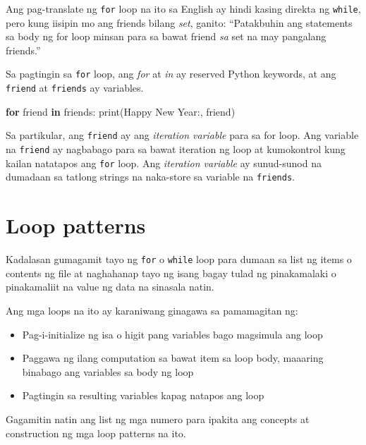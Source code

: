 \documentclass[10pt,]{book}
\newenvironment{Shaded}{}{}
\newcommand{\BuiltInTok}[1]{\textcolor[rgb]{0.00,0.50,0.00}{#1}}
\newcommand{\ControlFlowTok}[1]{\textcolor[rgb]{0.00,0.44,0.13}{\textbf{#1}}}
\newcommand{\KeywordTok}[1]{\textcolor[rgb]{0.00,0.44,0.13}{\textbf{#1}}}
\newcommand{\NormalTok}[1]{#1}
\newcommand{\StringTok}[1]{\textcolor[rgb]{0.25,0.44,0.63}{#1}}
\begin{document}
Ang pag-translate ng \texttt{for} loop na ito sa English ay hindi kasing
direkta ng \texttt{while}, pero kung iisipin mo ang friends bilang
\emph{set}, ganito: ``Patakbuhin ang statements sa body ng for loop
minsan para sa bawat friend \emph{sa} set na may pangalang friends.''

Sa pagtingin sa \texttt{for} loop, ang \emph{for} at \emph{in} ay
reserved Python keywords, at ang \texttt{friend} at \texttt{friends} ay
variables.

\begin{Shaded}
\begin{Highlighting}[]
\ControlFlowTok{for}\NormalTok{ friend }\KeywordTok{in}\NormalTok{ friends:}
    \BuiltInTok{print}\NormalTok{(}\StringTok{\textquotesingle{}Happy New Year:\textquotesingle{}}\NormalTok{, friend)}
\end{Highlighting}
\end{Shaded}

Sa partikular, ang \texttt{friend} ay ang \emph{iteration variable} para
sa for loop. Ang variable na \texttt{friend} ay nagbabago para sa bawat
iteration ng loop at kumokontrol kung kailan natatapos ang \texttt{for}
loop. Ang \emph{iteration variable} ay sunud-sunod na dumadaan sa
tatlong strings na naka-store sa variable na \texttt{friends}.

\section{Loop patterns}\label{loop-patterns}

Kadalasan gumagamit tayo ng \texttt{for} o \texttt{while} loop para
dumaan sa list ng items o contents ng file at naghahanap tayo ng isang
bagay tulad ng pinakamalaki o pinakamaliit na value ng data na sinasala
natin.

Ang mga loops na ito ay karaniwang ginagawa sa pamamagitan ng:

\begin{itemize}
\item
  Pag-i-initialize ng isa o higit pang variables bago magsimula ang loop
\item
  Paggawa ng ilang computation sa bawat item sa loop body, maaaring
  binabago ang variables sa body ng loop
\item
  Pagtingin sa resulting variables kapag natapos ang loop
\end{itemize}

Gagamitin natin ang list ng mga numero para ipakita ang concepts at
construction ng mga loop patterns na ito.
\end{document}
